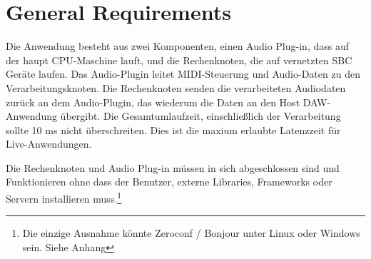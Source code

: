 \section{General Requirements}

Die Anwendung besteht aus zwei Komponenten, einen Audio Plug-in, dass auf der haupt CPU-Maschine lauft, und die Rechenknoten, die auf vernetzten SBC Geräte laufen. Das Audio-Plugin leitet MIDI-Steuerung und Audio-Daten zu den Verarbeitungsknoten. Die Rechenknoten senden die verarbeiteten Audiodaten zurück an dem Audio-Plugin, das wiederum die Daten an den Host DAW-Anwendung übergibt. Die Gesamtumlaufzeit, einschließlich der Verarbeitung sollte 10 ms nicht überschreiten. Dies ist die maxium erlaubte Latenzzeit für Live-Anwendungen\cite{AES67-2013}.

Die Rechenknoten und Audio Plug-in müssen in sich abgeschlossen sind und Funktionieren ohne dass der Benutzer, externe Libraries, Frameworks oder Servern installieren muss.\footnote{Die einzige Ausnahme könnte Zeroconf / Bonjour unter Linux oder Windows sein. Siehe Anhang}